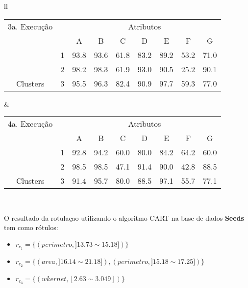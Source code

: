 \begin{table}[!h]
\begin{tabular}{ll}
   \small\addtolength{\tabcolsep}{-5pt}
   \begin{tabular}{|cl|c|c|c|c|c|c|c|}
        \hline \hline
          {\tiny  3a. Execução}   &   & \multicolumn{7}{c|}{Atributos}                                               \\ \cline{3-9} 
       \multicolumn{1}{|l}{}                            &   & A    & B & C & D & E & F & G \\ \hline
        \multicolumn{1}{|c|}{}                           & 1 & 93.8 & 93.6   & 61.8      & 83.2 & 89.2 & 53.2   & 71.0   \\ \cline{2-9} 
        \multicolumn{1}{|c|}{}                           & 2 & 98.2 & 98.3   & 61.9      & 93.0 & 90.5 & 25.2  & 90.1  \\ \cline{2-9} 
        \multicolumn{1}{|c|}{\multirow{-3}{*}{Clusters}} & 3 & 95.5 & 96.3   & 82.4      & 90.9 & 97.7 & 59.3  & 77.0  \\ \hline
   \end{tabular}
    
    &
    
       \small\addtolength{\tabcolsep}{-5pt}
   \begin{tabular}{|cl|c|c|c|c|c|c|c|}
        \hline \hline
         {\tiny 4a. Execução}       &   & \multicolumn{7}{c|}{Atributos}                                               \\ \cline{3-9} 
       \multicolumn{1}{|l}{}                            &   & A    & B & C & D & E & F & G \\ \hline
        \multicolumn{1}{|c|}{}                           & 1 & 92.8 & 94.2   & 60.0      & 80.0 & 84.2 & 64.2   & 60.0   \\ \cline{2-9} 
        \multicolumn{1}{|c|}{}                           & 2 & 98.5 & 98.5   & 47.1      & 91.4 & 90.0 & 42.8  & 88.5  \\ \cline{2-9} 
        \multicolumn{1}{|c|}{\multirow{-3}{*}{Clusters}} & 3 & 91.4 & 95.7   & 80.0      & 88.5 & 97.1 & 55.7  & 77.1  \\ \hline
   \end{tabular}
   \\
 
 \end{tabular}
 \label{tab:execucoes:seed:cart}
\end{table}

O resultado da rotulaçao utilizando o algoritmo CART na base de dados \textbf{Seeds} tem como rótulos: 
\begin{itemize}[noitemsep]
 \item ${r_{c_1}=\{ (perimetro, ]13.73 \sim 15.18]) \} }$
 \item ${r_{c_2}=\{ (area, ]16.14 \sim 21.18]), (perimetro, ]15.18 \sim 17.25]) \} }$
 \item ${r_{c_3}=\{ (wkernet, [2.63 \sim 3.049]) \} }$
\end{itemize}



